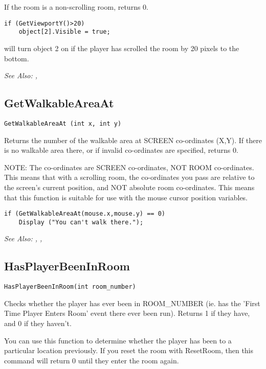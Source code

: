 If the room is a non-scrolling room, returns 0.

\begin{verbatim}
if (GetViewportY()>20)
    object[2].Visible = true;
\end{verbatim}
will turn object 2 on if the player has scrolled the room by 20 pixels to the bottom.

\it{See Also:} , 


\subsection{GetWalkableAreaAt}\label{GetWalkableAreaAt}%

\begin{verbatim}
GetWalkableAreaAt (int x, int y)
\end{verbatim}
Returns the number of the walkable area at SCREEN co-ordinates (X,Y).
If there is no walkable area there, or if invalid co-ordinates are specified,
returns 0.

NOTE: The co-ordinates are SCREEN co-ordinates, NOT ROOM co-ordinates. This
means that with a scrolling room, the co-ordinates you pass are relative to
the screen's current position, and NOT absolute room co-ordinates. This
means that this function is suitable for use with the mouse cursor position
variables.

\begin{verbatim}
if (GetWalkableAreaAt(mouse.x,mouse.y) == 0)
    Display ("You can't walk there.");
\end{verbatim}

\it{See Also:} ,
,


\subsection{HasPlayerBeenInRoom}\label{HasPlayerBeenInRoom}%

\begin{verbatim}
HasPlayerBeenInRoom(int room_number)
\end{verbatim}
Checks whether the player has ever been in ROOM_NUMBER (ie. has the 'First Time Player
Enters Room' event there ever been run). Returns 1 if they have, and 0 if they haven't.

You can use this function to determine whether the player has been to a particular location
previously. If you reset the room with ResetRoom, then this command will return 0 until
they enter the room again.

